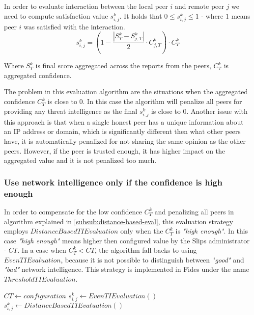 In order to evaluate interaction between the local peer $i$ and remote peer $j$ we need to compute satisfaction value $s^{k}_{i, j}$. 
It holds that  $0 \leq s^{k}_{i, j} \leq 1$ - where $1$ means peer $i$ was satisfied with the interaction.
\begin{equation}
s^{k}_{i, j} = (1 - \frac{|{S}^{k}_{T} - S^{k}_{j, T}|}{2} \cdot C^{k}_{j, T}) \cdot C^{k}_{T}
\end{equation}

Where $S^{k}_{T}$ is final score aggregated across the reports from the peers, $C^{k}_{T}$ is aggregated confidence.

The problem in this evaluation algorithm are the situations when the aggregated confidence $C^{k}_{T}$ is close to $0$. In this case the algorithm will penalize all peers for providing any threat intelligence as the final $s^{k}_{i, j}$ is close to $0$. Another issue with this approach is that when a single honest peer has a unique information about an IP address or domain, which is significantly different then what other peers have, it is automatically penalized for not sharing the same opinion as the other peers. However, if the peer is trusted enough, it has higher impact on the aggregated value and it is not penalized too much.

\subsubsection{Use network intelligence only if the confidence is high enough}
In order to compensate for the low confidence $C^{k}_{T}$ and penalizing all peers in algorithm explained in \ref{subsub:distance-based-eval}, this evaluation strategy employs $DistanceBasedTIEvaluation$ only when the $C^{k}_{T}$ is \textit{"high enough"}. In this case \textit{"high enough"} means higher then configured value by the Slips administrator - ${CT}$. In a case when  $C^{k}_{T} < {CT}$, the algorithm fall backs to using $EvenTIEvaluation$, because it is not possible to distinguish between \textit{"good"} and \textit{"bad"} network intelligence. This strategy is implemented in Fides under the name $ThresholdTIEvaluation$.
\begin{algorithm}
\caption{$ThresholdTIEvaluation$}\label{alg:threshold-ti-evaluation}
\begin{algorithmic}[1]
\State ${CT} \gets configuration$ 
	\State $s^{k}_{i, j} \gets EvenTIEvaluation()$
\Else
    \State $s^{k}_{i, j} \gets DistanceBasedTIEvaluation()$
\EndIf
\end{algorithmic}
\end{algorithm}


